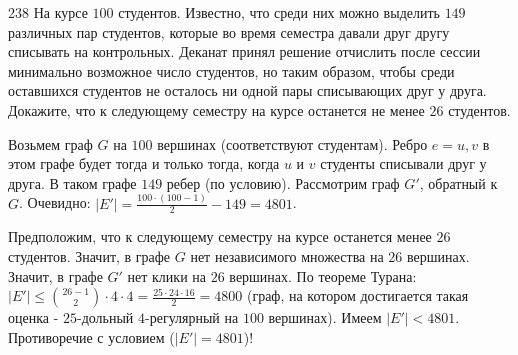 \begin{task}{238}
На курсе $100$ студентов. Известно, что среди них можно выделить 
$149$ различных пар студентов, которые во время семестра давали друг другу списывать на контрольных. Деканат принял решение отчислить после сессии минимально возможное число студентов, но таким образом, чтобы среди оставшихся студентов не осталось ни одной пары списывающих друг у друга. Докажите, что к следующему семестру на курсе останется не менее $26$ студентов.
\end{task}

\begin{solution}
Возьмем граф $G$ на $100$ вершинах (соответствуют студентам). Ребро $e = {u, v}$ в этом графе будет тогда и только тогда, когда $u$ и $v$ студенты списывали друг у друга. В таком графе $149$ ребер (по условию). Рассмотрим граф $G'$, обратный к $G$. Очевидно: $|E'| = \frac{100\cdot(100 - 1)}{2} - 149 = 4801$.\par
Предположим, что к следующему семестру на курсе останется менее  $26$ студентов. Значит, в графе $G$ нет независимого множества на $26$ вершинах. Значит, в графе $G'$ нет клики на $26$ вершинах. По теореме Турана: $|E'| \leq \binom{26 - 1}{2} \cdot4\cdot4 = \frac{25\cdot24\cdot16}{2} = 4800$ (граф, на котором достигается такая оценка - $25$-дольный $4$-регулярный на $100$ вершинах). Имеем $|E'| < 4801$. Противоречие с условием ($|E'| = 4801$)!
\end{solution}